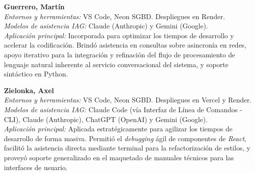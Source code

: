 \vspace{0.3cm}

\noindent \textbf{Guerrero, Martín} \\
\textit{Entornos y herramientas:} VS Code, Neon SGBD. Despliegues en Render. \\
\textit{Modelos de asistencia IAG:} Claude (Anthropic) y Gemini (Google). \\
\textit{Aplicación principal:} Incorporada para optimizar los tiempos de desarrollo y acelerar la codificación. Brindó asistencia en consultas sobre asincronía en redes, apoyo iterativo para la integración y refinación del flujo de procesamiento de lenguaje natural inherente al servicio conversacional del sistema, y soporte sintáctico en Python.

\vspace{0.3cm}

\noindent \textbf{Zielonka, Axel} \\
\textit{Entornos y herramientas:} VS Code, Neon SGBD. Despliegues en Vercel y Render. \\
\textit{Modelos de asistencia IAG:} Claude Code (vía Interfaz de Línea de Comandos - CLI), Claude (Anthropic), ChatGPT (OpenAI) y Gemini (Google). \\
\textit{Aplicación principal:} Aplicada estratégicamente para agilizar los tiempos de desarrollo de forma masiva. Permitió el \textit{debugging} ágil de componentes de \textit{React}, facilitó la asistencia directa mediante terminal para la refactorización de estilos, y proveyó soporte generalizado en el maquetado de manuales técnicos para las interfaces de usuario.
